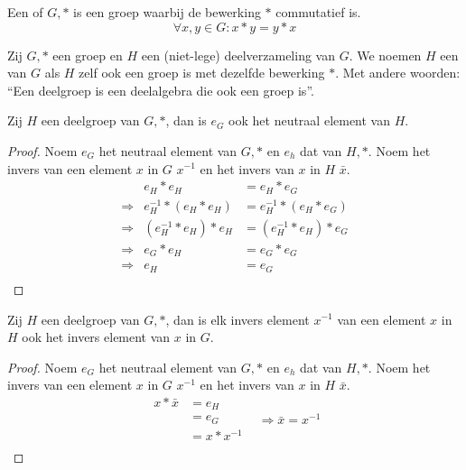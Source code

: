\documentclass[main.tex]{subfiles}
\begin{document}
\begin{de}
  Een  of  $G,*$ is een groep waarbij de bewerking $*$ commutatief is.
  \[ \forall x,y \in G: x * y = y * x\]
\end{de}

\begin{de}
  Zij $G,*$ een groep en $H$ een (niet-lege) deelverzameling van $G$. We noemen $H$ een  van $G$ als $H$ zelf ook een groep is met dezelfde bewerking $*$.
  Met andere woorden: ``Een deelgroep is een deelalgebra die ook een groep is''.
\end{de}

\begin{st}
  \label{st:deelgroep-zelfde-neutraal-element}
  Zij $H$ een deelgroep van $G,*$, dan is $e_{G}$ ook het neutraal element van $H$.

  \begin{proof}
    Noem $e_{G}$ het neutraal element van $G,*$ en $e_{h}$ dat van $H,*$. Noem het invers van een element $x$ in $G$ $x^{-1}$ en het invers van $x$ in $H$ $\bar{x}$.
    \[
    \begin{array}{rrl}
                  & e_{H} * e_{H} &= e_{H} * e_{G}\\
      \Rightarrow & e^{-1}_{H} * (e_{H} * e_{H}) &= e^{-1}_{H} * (e_{H} * e_{G})\\
      \Rightarrow & (e^{-1}_{H} * e_{H}) * e_{H} &= (e^{-1}_{H} * e_{H}) * e_{G}\\
      \Rightarrow & e_{G} * e_{H} &= e_{G} * e_{G}\\
      \Rightarrow & e_{H} &= e_{G}\\
    \end{array}
    \]
  \end{proof}
\end{st}

\begin{st}
  \label{st:deelgroep-houdt-invers-ook-in}
  Zij $H$ een deelgroep van $G,*$, dan is elk invers element $x^{-1}$ van een element $x$ in $H$ ook het invers element van $x$ in $G$.

  \begin{proof}
    Noem $e_{G}$ het neutraal element van $G,*$ en $e_{h}$ dat van $H,*$.
    Noem het invers van een element $x$ in $G$ $x^{-1}$ en het invers van $x$ in $H$ $\bar{x}$.
    \[
    \begin{array}{rll}
      x * \bar x &= e_{H} &\\
                 &= e_{G} &\\
                 &= x * x^{-1} &\\
    \end{array}
    \Rightarrow \bar x = x^{-1}
    \]
  \end{proof}
\end{st}
\end{document}
